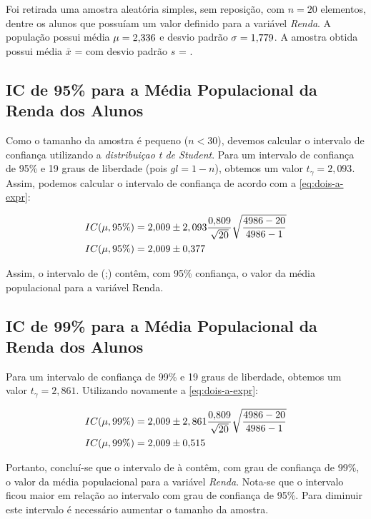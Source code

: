 

	Foi retirada uma amostra aleatória simples, sem reposição, com $n = 20$
	elementos, dentre os \TRESN alunos que possuíam um valor definido para a
	variável \textit{Renda}.
	A população possui média $\mu = \num{2.336}$ e desvio padrão $\sigma = \num{1.779}$.
	A amostra obtida possui média $\bar{x}$ = \TRESx com desvio padrão $s$ = \TRESsd.

\subsection{IC de 95\% para a Média Populacional da Renda dos Alunos}

	Como o tamanho da amostra é pequeno ($n < 30$), devemos calcular o intervalo
	de confiança utilizando a \textit{distribuiçao t de Student}. Para um
	intervalo de confiança de 95\% e 19 graus de liberdade (pois $gl = 1-n$),
	obtemos um valor $t_{\gamma} = 2,093$.  Assim, podemos calcular o intervalo de
	confiança de acordo com a \autoref{eq:dois-a-expr}:

	\begin{align*}
		IC (\mu, 95\%) &= \num{2.009} \pm 2,093 \frac{\num{0.809}}{\sqrt{\num{20}}} \sqrt{\frac{\num{4986} - \num{20}}{\num{4986} - 1}} \\
		IC (\mu, 95\%) &= \num{2.009} \pm \num{0.377}
	\end{align*}

	Assim, o intervalo de (\TRESicmin;\TRESicmax) contêm, com 95\% confiança, o
	valor da média populacional para a variável Renda.

\subsection{IC de 99\% para a Média Populacional da Renda dos Alunos}

	Para um intervalo de confiança de 99\% e 19 graus de liberdade, obtemos
	um valor $t_{\gamma} = 2,861$.  Utilizando novamente a \autoref{eq:dois-a-expr}:

	\begin{align*}
		IC (\mu, 99\%) &= \num{2.009} \pm 2,861 \frac{\num{0.809}}{\sqrt{\num{20}}} \sqrt{\frac{\num{4986} - \num{20}}{\num{4986} - 1}} \\
		IC (\mu, 99\%) &= \num{2.009} \pm \num{0.515}
	\end{align*}

	Portanto, concluí-se que o intervalo de \TRESicNoveNoveMin à \TRESicNoveNoveMax contêm,
	com grau de confiança de 99\%, o valor da média populacional para a
	variável \textit{Renda}. Nota-se que o intervalo ficou maior em relação ao
	intervalo com grau de confiança de 95\%.  Para diminuir este intervalo é
	necessário aumentar o tamanho da amostra.

